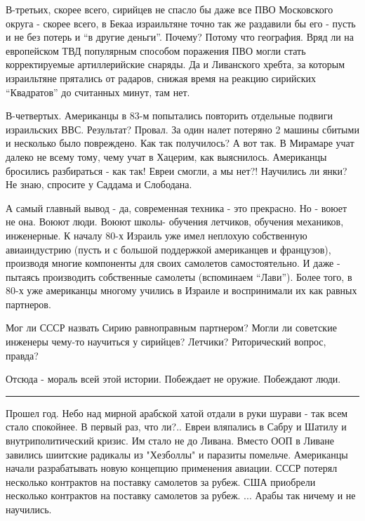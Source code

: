 В-третьих, скорее всего, сирийцев не спасло бы даже все ПВО Московского округа - скорее всего, в Бекаа израильтяне точно так же раздавили бы его - пусть и не без потерь и “в другие деньги”. Почему? Потому что география. Вряд ли на европейском ТВД популярным способом поражения ПВО могли стать корректируемые артиллерийские снаряды. Да и Ливанского хребта, за которым израильтяне прятались от радаров, снижая время на реакцию сирийских “Квадратов” до считанных минут, там нет.

В-четвертых. Американцы в 83-м попытались повторить отдельные подвиги израильских ВВС. Результат? Провал. За один налет потеряно 2 машины сбитыми и несколько было повреждено. Как так получилось? А вот так. В Мирамаре учат далеко не всему тому, чему учат в Хацерим, как выяснилось. Американцы бросились разбираться - как так! Евреи смогли, а мы нет?! Научились ли янки? Не знаю, спросите у Саддама и Слободана.

А самый главный вывод - да, современная техника - это прекрасно. Но - воюет не она. Воюют люди. Воюют школы- обучения летчиков, обучения механиков, инженерные. К началу 80-х Израиль уже имел неплохую собственную авиаиндустрию (пусть и с большой поддержкой американцев и французов), производя многие компоненты для своих самолетов самостоятельно. И даже - пытаясь производить собственные самолеты (вспоминаем “Лави”). Более того, в 80-х уже американцы многому учились в Израиле и воспринимали их как равных партнеров.

Мог ли СССР назвать Сирию равноправным партнером? Могли ли советские инженеры чему-то научиться у сирийцев? Летчики? Риторический вопрос, правда?

Отсюда - мораль всей этой истории. Побеждает не оружие. Побеждают люди. 

\rule{10cm}{1pt}
Прошел год.
Небо над мирной арабской хатой отдали в руки шурави - так всем стало спокойнее. В первый раз, что ли?..
Евреи вляпались в Сабру и Шатилу и внутриполитический кризис. Им стало не до Ливана.
Вместо ООП в Ливане завились шиитские радикалы из "Хезболлы" и паразиты помельче.
Американцы начали разрабатывать новую концепцию применения авиации.
СССР потерял несколько контрактов на поставку самолетов за рубеж.
США приобрели несколько контрактов на поставку самолетов за рубеж.
...
Арабы так ничему и не научились.

